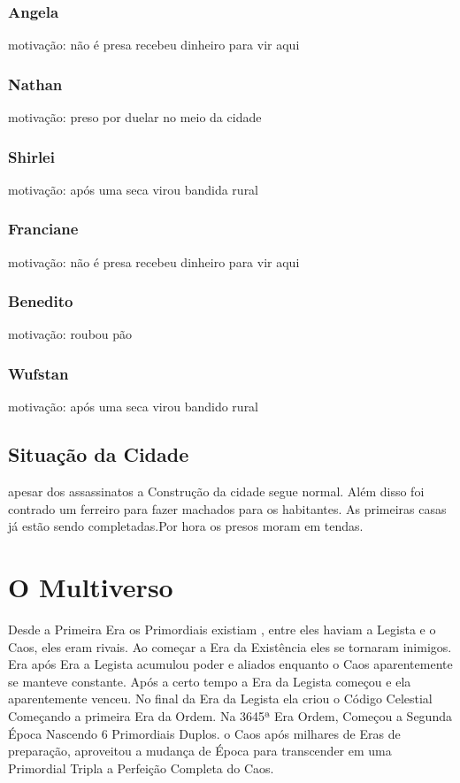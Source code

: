 \subsection{Angela}
motivação: não é presa recebeu dinheiro para vir aqui
\subsection{Nathan}
motivação: preso por duelar no meio da cidade
\subsection{Shirlei}
motivação: após uma seca virou bandida rural 
\subsection{Franciane}
motivação: não é presa recebeu dinheiro para vir aqui
\subsection{Benedito}
motivação: roubou pão
\subsection{Wufstan}
motivação: após uma seca virou bandido rural 
\section{Situação da Cidade}
apesar dos assassinatos a Construção da cidade segue normal.
Além disso foi contrado um ferreiro para fazer machados para os habitantes.
As primeiras casas já estão sendo completadas.Por hora os presos moram em tendas.

\chapter{O Multiverso}
Desde a Primeira Era os Primordiais existiam , entre eles haviam a Legista e o Caos, eles eram rivais.
Ao começar a Era da Existência eles se tornaram inimigos.
Era após Era a Legista acumulou poder e aliados enquanto o Caos aparentemente se manteve constante.
Após a certo tempo a Era da Legista começou e ela aparentemente venceu. 
No final da Era da Legista ela criou o Código Celestial Começando a primeira Era da Ordem.
Na 3645ª Era Ordem, Começou a Segunda Época Nascendo 6 Primordiais Duplos. 
o Caos após milhares de Eras de preparação, aproveitou a mudança de Época para
transcender em uma Primordial Tripla a Perfeição Completa do Caos.

